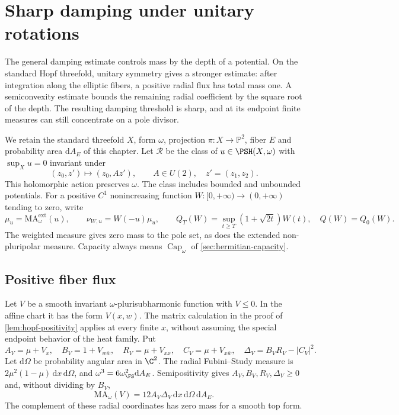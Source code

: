 \section{Sharp damping under unitary rotations}
\label{sec:hopf-rotational-damping}

The general damping estimate controls mass by the depth of a potential. On the standard Hopf threefold, unitary symmetry gives a stronger estimate: after integration along the elliptic fibers, a positive radial flux has total mass one. A semiconvexity estimate bounds the remaining radial coefficient by the square root of the depth. The resulting damping threshold is sharp, and at its endpoint finite measures can still concentrate on a pole divisor.

We retain the standard threefold $X$, form $\omega$, projection $\pi:X\to\mathbb P^2$, fiber $E$ and probability area $\mathrm dA_E$ of this chapter. Let $\mathcal R$ be the class of $u\in\PSH(X,\omega)$ with $\sup_Xu=0$ invariant under
\[
 (z_0,z')\longmapsto(z_0,Az'),\qquad A\in U(2),\quad z'=(z_1,z_2).
\]
This holomorphic action preserves $\omega$. The class includes bounded and unbounded potentials. For a positive $C^1$ nonincreasing function $W:[0,+\infty)\to(0,+\infty)$ tending to zero, write
\[
 \mu_u=\mathrm{MA}^{\mathrm{ext}}_\omega(u),\qquad
 \nu_{W,u}=W(-u)\mu_u,
 \qquad Q_T(W)=\sup_{t\geq T}(1+\sqrt{2t})W(t),\quad Q(W)=Q_0(W).
\]
The weighted measure gives zero mass to the pole set, as does the extended non-pluripolar measure. Capacity always means $\operatorname{Cap}_\omega$ of \cref{sec:hermitian-capacity}.

\subsection{Positive fiber flux}

Let $V$ be a smooth invariant $\omega$-plurisubharmonic function with $V\leq0$.
In the affine chart it has the form $V(x,w)$. The matrix calculation in the proof of \cref{lem:hopf-positivity}
applies at every finite $x$, without assuming the special endpoint behavior
of the heat family. Put
\[
 A_V=\mu+V_x,\quad B_V=1+V_{w\bar w},\quad
 R_V=\mu+V_{xx},\quad C_V=\mu+V_{x\bar w},\quad
 \Delta_V=B_VR_V-|C_V|^2.
\]
Let $\mathrm d\Omega$ be probability angular area in $\C^2$. The radial Fubini--Study measure is $2\mu^2(1-\mu)\,\mathrm dx\,\mathrm d\Omega$, and $\omega^3=6\omega_{\FS}^2\mathrm dA_E$. Semipositivity gives $A_V,B_V,R_V,\Delta_V\geq0$ and, without dividing
by $B_V$,
\begin{equation}\label{eq:rotational-positive-density}
 \mathrm{MA}_\omega(V)=12 A_V\Delta_V\,
       \mathrm dx\,\mathrm d\Omega\,\mathrm dA_E.
\end{equation}
The complement of these radial coordinates has zero mass for a smooth top form.

